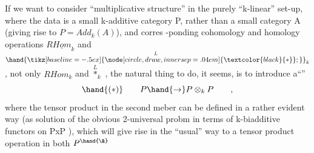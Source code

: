 \hand{\uline{\textcolor{black}{Remarks}}}  If we want to consider ``multiplicative structure'' in the purely
``k-linear'' set-up, where the data is a small k-additive category P,
rather than a small category A (giving rise to $P = Add_k(A)$), and corres
-ponding cohomology  and homology operations $R\underline{Hom}_k$ and $\overset{L}{\hand{\mathbin{\tikz[baseline=-.5ex]{\node[circle,draw,inner sep=.04em] {\ensuremath{\textcolor{black}{*}}};}}}}_k$ ,
not only $RHom_k$ and $\overset{L}{\ast}_k$ , the natural thing to do, it seems, is to
introduce a\hand{\textbackslash}``\hand{\uline{\textcolor{black}{diagonal map}}}''
\[ \hand{(*)} \qquad P \hand{\to} P\otimes_k P \qquad , \]
where the tensor product in the second meber  can be defined in a
rather evident way (as solution of the obvious 2-universal probm in
terms of k-biadditive functors on PxP ), which will give rise in the
``usual'' way to a tensor product operation in both $P^{\hand{\&}}$ 

